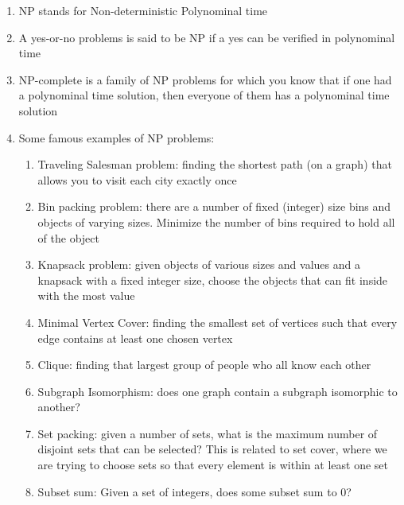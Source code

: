 \documentclass [12pt, executivepaper]{article}
\begin{document}
\begin{enumerate}

\item NP stands for Non-deterministic Polynominal time

\item A yes-or-no problems is said to be NP if a yes can be verified in polynominal time

\item NP-complete is a family of NP problems for which you know that if one had a polynominal time solution, then everyone of them has a polynominal time solution

\item Some famous examples of NP problems:

\pagebreak

\vspace*{-40mm}

\begin{enumerate}

\item Traveling Salesman problem: finding the shortest path (on a graph) that allows you to visit each city exactly once

\item Bin packing problem: there are a number of fixed (integer) size bins and objects of varying sizes. Minimize the number of bins required to hold all of the object

\item Knapsack problem: given objects of various sizes and values and a knapsack with a fixed integer size, choose the objects that can fit inside with the most value

\item Minimal Vertex Cover: finding the smallest set of vertices such that every edge contains at least one chosen vertex

\item Clique: finding that largest group of people who all know each other

\item Subgraph Isomorphism: does one graph contain a subgraph isomorphic to another?

\item Set packing: given a number of sets, what is the maximum number of disjoint sets that can be selected? This is related to set cover, where we are trying to choose sets so that every element is within at least one set

\item Subset sum: Given a set of integers, does some subset sum to 0?

\end{enumerate}

\end{enumerate}
\end{document}
